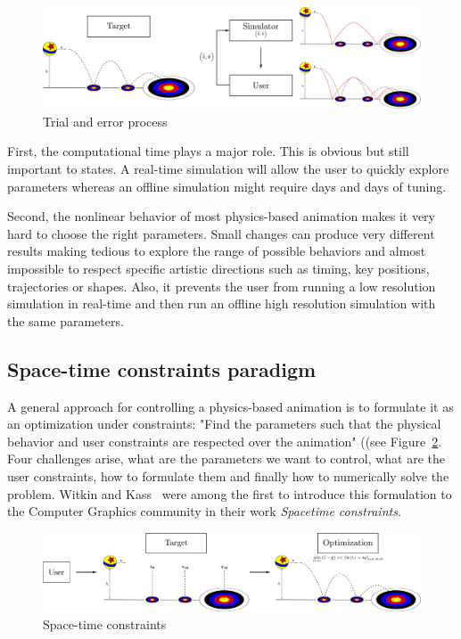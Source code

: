 \begin{figure}[!h]
\centering
\includegraphics[scale=0.20]{./images/simulationControl/trialError.png}
\caption[STAR control: Trial and error process]{\label{fig:trialErrorProcess}Trial and error process}
\end{figure}

First, the computational time plays a major role. This is obvious but still important to states. A real-time simulation will allow the user to quickly explore parameters whereas an offline simulation might require days and days of tuning.

Second, the nonlinear behavior of most physics-based animation makes it very hard to choose the right parameters. Small changes can produce very different results making tedious to explore the range of possible behaviors and almost impossible to respect specific artistic directions such as timing, key positions, trajectories or shapes. Also, it prevents the user from running a low resolution simulation in real-time and then run an offline high resolution simulation with the same parameters.

\subsection{Space-time constraints paradigm}
A general approach for controlling a physics-based animation is to formulate it as an optimization under constraints: "Find the parameters such that the physical behavior and user constraints are respected over the animation" ((see Figure~\ref{fig:spaceTimeConstraints}. Four challenges arise, what are the parameters we want to control, what are the user constraints, how to formulate them and finally how to numerically solve the problem. Witkin and Kass~\cite{Witkin1988} were among the first to introduce this formulation to the Computer Graphics community in their work \emph{Spacetime constraints}.

\begin{figure}[!h]
\centering
\includegraphics[scale=0.20]{./images/simulationControl/spaceTimeConstraints.png}
\caption[STAR control: Space-time constraints]{\label{fig:spaceTimeConstraints} Space-time constraints}
\end{figure}

